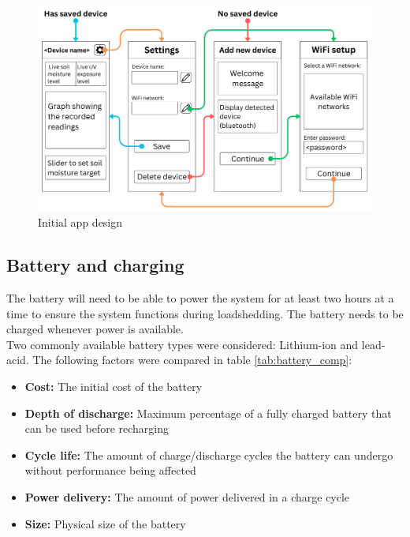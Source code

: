 \begin{figure}[!h]
    \centering
    \includegraphics[width= \textwidth]{Report/general_design/fig/app_flow_rough.png}
    \caption{Initial app design}
    \label{fig:app_flow_rough}
\end{figure}



\subsection{Battery and charging}
The battery will need to be able to power the system for at least two hours at a time to ensure the system functions during loadshedding. The battery needs to be charged whenever power is available. 
\\

Two commonly available battery types were considered: Lithium-ion and lead-acid. The following factors were compared in table \ref{tab:battery_comp}: 

\begin{itemize}
    \item \textbf{Cost:} The initial cost of the battery
    \item \textbf{Depth of discharge:} Maximum percentage of a fully charged battery that can be used before recharging
    \item \textbf{Cycle life:} The amount of charge/discharge cycles the battery can undergo without performance being affected
    \item \textbf{Power delivery:} The amount of power delivered in a charge cycle
    \item \textbf{Size:} Physical size of the battery
\end{itemize}

